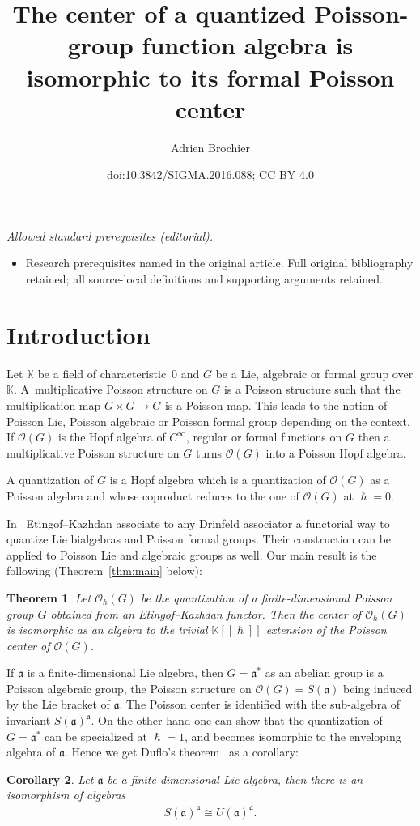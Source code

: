 \documentclass[10pt,a4paper]{amsart}
\title{The center of a quantized Poisson-group function algebra is isomorphic to its formal Poisson center}
\author{Adrien Brochier}
\date{doi:10.3842/SIGMA.2016.088; CC BY 4.0}
\numberwithin{equation}{section}
\newcommand{\mf}[1]{\mathfrak{#1}}
\newcommand{\h}{\hslash}
\newcommand{\cO}{\mathcal O}
\newcommand{\kk}{\mathbb K}
\newtheorem{thm}{Theorem}[section]
\newtheorem{cor}[thm]{Corollary}
\theoremstyle{definition}
\begin{document}
\maketitle
\noindent\textit{Allowed standard prerequisites (editorial).}\begin{itemize}
\item Research prerequisites named in the original article. Full original bibliography retained; all source-local definitions and supporting arguments retained.
\end{itemize}\medskip
\section{Introduction}

Let $\kk$ be a f\/ield of characteristic~0 and $G$ be a Lie, algebraic or formal group over $\kk$. A~multiplicative Poisson structure on $G$ is a Poisson structure such that the multiplication map $G\times G\rightarrow G$ is a Poisson map. This leads to the notion of Poisson Lie, Poisson algebraic or Poisson formal group depending on the context. If $\cO(G)$ is the Hopf algebra of $C^{\infty}$, regular or formal functions on $G$ then a multiplicative Poisson structure on $G$ turns $\cO(G)$ into a Poisson Hopf algebra.

A quantization of $G$ is a Hopf algebra which is a quantization of $\cO(G)$ as a Poisson algebra and whose coproduct reduces to the one of $\cO(G)$ at $\h=0$.

In~\cite{Etingof1996} Etingof--Kazhdan associate to any Drinfeld associator a functorial way to quantize Lie bialgebras and Poisson formal groups. Their construction can be applied to Poisson Lie and algebraic groups as well. Our main result is the following (Theorem~\ref{thm:main} below):
\begin{thm}\label{thm:intro}
	Let $\cO_\h(G)$ be the quantization of a finite-dimensional Poisson group $G$ obtained from an Etingof--Kazhdan functor. Then the center of $\cO_\h(G)$ is isomorphic as an algebra to the trivial $\kk[[\h]]$ extension of the Poisson center of $\cO(G)$.
\end{thm}

If $\mf a$ is a f\/inite-dimensional Lie algebra, then $G=\mf a^*$ as an abelian group is a Poisson algebraic group, the Poisson structure on $\cO(G)=S(\mf a)$ being induced by the Lie bracket of $\mf a$. The Poisson center is identif\/ied with the sub-algebra of invariant $S(\mf a)^{\mf a}$. On the other hand one can show that the quantization of $G=\mf a^*$ can be specialized at $\h=1$, and becomes isomorphic to the enveloping algebra of $\mf a$. Hence we get Duf\/lo's theorem~\cite{Duflo1977} as a corollary:
\begin{cor}
Let $\mf a$ be a finite-dimensional Lie algebra, then there is an isomorphism of algebras
\begin{gather*}
	S(\mf a)^{\mf a}\cong U(\mf a)^{\mf a}.
\end{gather*}
\end{cor}
\end{document}
